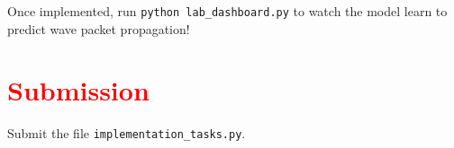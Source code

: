 \documentclass[11pt]{article}
\begin{document}
Once implemented, run \lstinline|python lab_dashboard.py| to watch the model learn to predict wave packet propagation!

\section*{\textcolor{red}{Submission}}

Submit the file \texttt{implementation\_tasks.py}.
\end{document}
